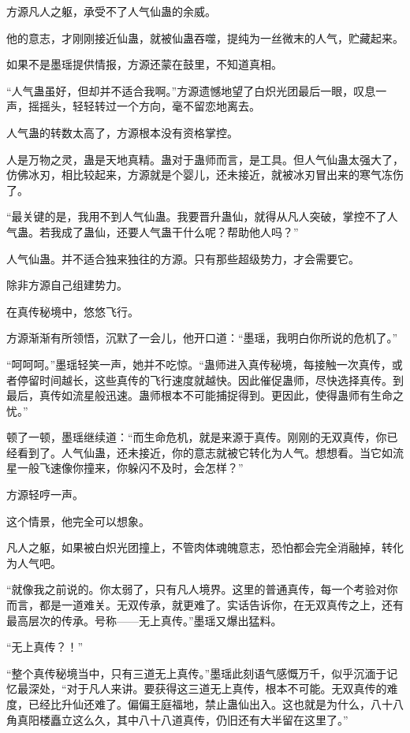 \begin{this_body}
方源凡人之躯，承受不了人气仙蛊的余威。

他的意志，才刚刚接近仙蛊，就被仙蛊吞噬，提纯为一丝微末的人气，贮藏起来。

如果不是墨瑶提供情报，方源还蒙在鼓里，不知道真相。

“人气蛊虽好，但却并不适合我啊。”方源遗憾地望了白炽光团最后一眼，叹息一声，摇摇头，轻轻转过一个方向，毫不留恋地离去。

人气蛊的转数太高了，方源根本没有资格掌控。

人是万物之灵，蛊是天地真精。蛊对于蛊师而言，是工具。但人气仙蛊太强大了，仿佛冰刃，相比较起来，方源就是个婴儿，还未接近，就被冰刃冒出来的寒气冻伤了。

“最关键的是，我用不到人气仙蛊。我要晋升蛊仙，就得从凡人突破，掌控不了人气蛊。若我成了蛊仙，还要人气蛊干什么呢？帮助他人吗？”

人气仙蛊。并不适合独来独往的方源。只有那些超级势力，才会需要它。

除非方源自己组建势力。

在真传秘境中，悠悠飞行。

方源渐渐有所领悟，沉默了一会儿，他开口道：“墨瑶，我明白你所说的危机了。”

“呵呵呵。”墨瑶轻笑一声，她并不吃惊。“蛊师进入真传秘境，每接触一次真传，或者停留时间越长，这些真传的飞行速度就越快。因此催促蛊师，尽快选择真传。到最后，真传如流星般迅速。蛊师根本不可能捕捉得到。更因此，使得蛊师有生命之忧。”

顿了一顿，墨瑶继续道：“而生命危机，就是来源于真传。刚刚的无双真传，你已经看到了。人气仙蛊，还未接近，你的意志就被它转化为人气。想想看。当它如流星一般飞速像你撞来，你躲闪不及时，会怎样？”

方源轻哼一声。

这个情景，他完全可以想象。

凡人之躯，如果被白炽光团撞上，不管肉体魂魄意志，恐怕都会完全消融掉，转化为人气吧。

“就像我之前说的。你太弱了，只有凡人境界。这里的普通真传，每一个考验对你而言，都是一道难关。无双传承，就更难了。实话告诉你，在无双真传之上，还有最高层次的传承。号称——无上真传。”墨瑶又爆出猛料。

“无上真传？！”

“整个真传秘境当中，只有三道无上真传。”墨瑶此刻语气感慨万千，似乎沉湎于记忆最深处，“对于凡人来讲。要获得这三道无上真传，根本不可能。无双真传的难度，已经比升仙还难了。偏偏王庭福地，禁止蛊仙出入。这也就是为什么，八十八角真阳楼矗立这么久，其中八十八道真传，仍旧还有大半留在这里了。”


\end{this_body}
